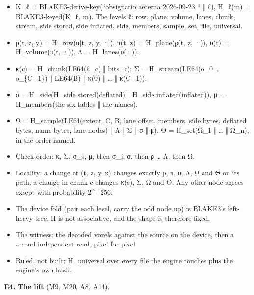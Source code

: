 \begin{itemize}
\item K\_\allowbreak{}ℓ = BLAKE3-derive-key(“obsignatio aeterna 2026-09-23 “ ‖ ℓ), H\_\allowbreak{}ℓ(m) = BLAKE3-keyed(K\_\allowbreak{}ℓ, m). The levels ℓ: row, plane, volume, lanes, chunk, stream, side stored, side inflated, side, members, sample, set, file, universal.
\item ρ(t, z, y) = H\_\allowbreak{}row(u[t, z, y, ·]), π(t, z) = H\_\allowbreak{}plane(ρ(t, z, ·)), υ(t) = H\_\allowbreak{}volume(π(t, ·)), Λ = H\_\allowbreak{}lanes(υ(·)).
\item κ(c) = H\_\allowbreak{}chunk(LE64(ℓ\_\allowbreak{}c) ‖ bits\_\allowbreak{}c); Σ = H\_\allowbreak{}stream(LE64(o\_\allowbreak{}0 … o\_\allowbreak{}\{C−1\}) ‖ LE64(B) ‖ κ(0) ‖ … ‖ κ(C−1)).
\item σ = H\_\allowbreak{}side(H\_\allowbreak{}side stored(deflated) ‖ H\_\allowbreak{}side inflated(inflated)), μ = H\_\allowbreak{}members(the six tables ‖ the names).
\item Ω = H\_\allowbreak{}sample(LE64(extent, C, B, lane offset, members, side bytes, deflated bytes, name bytes, lane nodes) ‖ Λ ‖ Σ ‖ σ ‖ μ). Θ = H\_\allowbreak{}set(Ω\_\allowbreak{}1 ‖ … ‖ Ω\_\allowbreak{}n), in the order named.
\item Check order: κ, Σ, σ\_\allowbreak{}s, μ, then σ\_\allowbreak{}i, σ, then ρ … Λ, then Ω.
\item Locality: a change at (t, z, y, x) changes exactly ρ, π, υ, Λ, Ω and Θ on its path; a change in chunk c changes κ(c), Σ, Ω and Θ. Any other node agrees except with probability 2\textasciicircum{}−256.
\item The device fold (pair each level, carry the odd node up) is BLAKE3's left-heavy tree. H is not associative, and the shape is therefore fixed.
\item The witness: the decoded voxels against the source on the device, then a second independent read, pixel for pixel.
\item Ruled, not built: H\_\allowbreak{}universal over every file the engine touches plus the engine's own hash.
\end{itemize}

\textbf{E4. The lift} (M9, M20, A8, A14).

